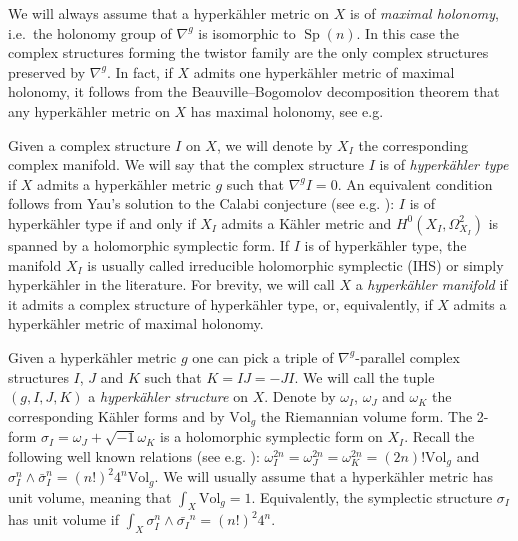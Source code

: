 \documentclass[11pt]{article}
\newcommand{\6}{\partial}
\newcommand{\bbC}{\mathbb{C}}
\newcommand{\Sp}{\operatorname{Sp}}
\newcommand{\ii}{\sqrt{-1}}
\newcommand{\wdg}{\wedge}
\newcommand{\Vol}{\mathrm{Vol}}
\begin{document}
We will always assume that a hyperk\"ahler metric on $X$ is of {\it maximal holonomy}, i.e.\ the holonomy
group of $\nabla^g$ is isomorphic to $\Sp(n)$. In this case the complex structures forming the twistor
family are the only complex structures preserved by $\nabla^g$. In fact, if $X$ admits one hyperk\"ahler
metric of maximal holonomy, it follows from the Beauville--Bogomolov decomposition theorem \cite{Be}
that any hyperk\"ahler metric on $X$ has maximal holonomy, see e.g. \cite[Proposition 3.1]{So}

Given a complex structure $I$ on $X$, we will denote by $X_I$ the corresponding complex manifold.
We will say that the complex structure $I$ is of {\em hyperk\"ahler type} if $X$
admits a hyperk\"ahler metric $g$ such that $\nabla^g I = 0$.
An equivalent condition follows from Yau's solution to the Calabi conjecture
(see e.g. \cite[section 2]{Be}): $I$ is of hyperk\"ahler type if and only if $X_I$ admits
a K\"ahler metric and $H^0(X_I,\Omega^2_{X_I})$ is spanned by a holomorphic symplectic
form. If $I$ is of hyperk\"ahler type, the manifold $X_I$ is usually called irreducible
holomorphic symplectic (IHS) or simply hyperk\"ahler in the literature.
For brevity, we will call $X$ a {\em hyperk\"ahler manifold} if it admits a complex structure
of hyperk\"ahler type, or, equivalently, if $X$ admits a hyperk\"ahler metric of maximal holonomy.


Given a hyperk\"ahler metric $g$ one can pick a triple of $\nabla^g$-parallel complex structures $I$, $J$ and $K$
such that $K = IJ=-JI$. We will call the tuple $(g,I,J,K)$ a {\it hyperk\"ahler structure} on $X$.
Denote by $\omega_I$, $\omega_J$ and $\omega_K$ the corresponding K\"ahler forms and by $\Vol_g$
the Riemannian volume form. The 2-form $\sigma_I = \omega_J +\ii\omega_K$ is a holomorphic
symplectic form on $X_I$. Recall the following well known relations (see e.g. \cite{Hu}):
$\omega_I^{2n} = \omega_J^{2n} = \omega_K^{2n} = (2n)!\Vol_g$ and $\sigma_I^n\wdg\bar{\sigma}_I^n = (n!)^2 4^n\Vol_g$.
We will usually assume that a hyperk\"ahler metric has unit volume, meaning that $\int_X \Vol_g = 1$.
Equivalently, the symplectic structure $\sigma_I$ has unit volume if $\int_X \sigma_I^n\wdg\bar{\sigma_I}^n = (n!)^{2}4^{n}$.
\end{document}
